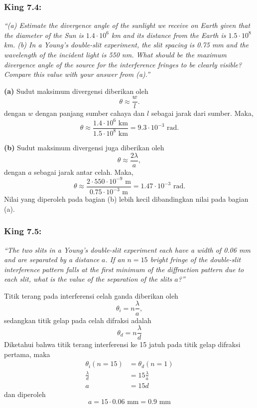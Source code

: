\documentclass[../../../main.tex]{subfiles}
\begin{document}
\subsubsection{King 7.4:}  \emph{\enquote{(a) Estimate the divergence angle of the sunlight we receive on Earth given that the diameter of the Sun is $1.4 \cdot10^6$ km and its distance from the Earth is $1.5 \cdot 10^8$ km. (b) In a Young’s double-slit experiment, the slit spacing is 0.75 mm and the wavelength of the incident light is 550 nm. What should be the maximum divergence angle of the source for the interference fringes to be clearly visible? Compare this value with your answer from (a).}}

\textbf{(a)} Sudut maksimum divergensi diberikan oleh 
\begin{equation*}
  \theta\approx\frac{w}{l}.
\end{equation*}
dengan $w$ dengan panjang sumber cahaya dan $l$ sebagai jarak dari sumber. Maka,
\begin{equation*}
  \theta\approx\frac{1.4 \cdot10^6 \text{ km}}{1.5 \cdot 10^8\text{ km}}=\boxed{9.3\cdot10^{-3}\text{ rad.}}
\end{equation*}

\textbf{(b)} Sudut maksimum divergensi juga diberikan oleh
\begin{equation*}
  \theta\approx\frac{2\lambda}{a},
\end{equation*}
dengan $a$ sebagai jarak antar celah. Maka,
\begin{equation*}
  \theta\approx\frac{2\cdot 550\cdot10^{-9} \text{ m}}{0.75\cdot10^{-3} \text{ m}}=\boxed{1.47\cdot10^{-3}\text{ rad}.}
\end{equation*}
Nilai yang diperoleh pada bagian (b) lebih kecil dibandingkan nilai pada bagian (a).

\subsubsection{King 7.5:} \emph{\enquote{The two slits in a Young’s double-slit experiment each have a width of 0.06 mm and are separated by a distance $a$. If an $n = 15$ bright fringe of the double-slit interference pattern falls at the ﬁrst minimum of the diffraction pattern due to each slit, what is the value of the separation of the slits $a$?}}

Titik terang pada interferensi celah ganda diberikan oleh 
\begin{equation*}
  \theta_i=n\frac{\lambda}{a},
\end{equation*}
sedangkan titik gelap pada celah difraksi adalah
\begin{equation*}
  \theta_d=n\frac{\lambda}{d}
\end{equation*}
Diketahui bahwa titik terang interferensi ke 15 jatuh pada titik gelap difraksi pertama, maka 
\begin{align*}
  \theta_i(n=15)&=\theta_d(n=1)\\
  \frac{\lambda}{d}&=15\frac{\lambda}{a}\\
  a&=15d
\end{align*}
dan diperoleh
\begin{equation*}
  a=15\cdot0.06 \text{ mm}=\boxed{0.9 \text{ mm}}
\end{equation*}
\end{document}
